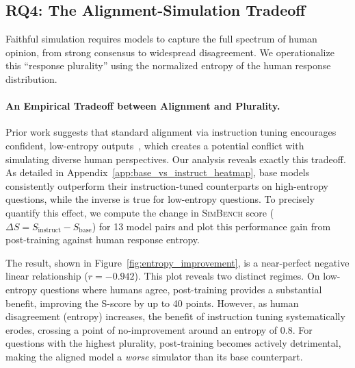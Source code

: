 \documentclass{article} %
\begin{document}
\subsection{RQ4: The Alignment-Simulation Tradeoff}
\label{sec:response_plurality}

Faithful simulation requires models to capture the full spectrum of human opinion, from strong consensus to widespread disagreement. We operationalize this ``response plurality'' using the normalized entropy of the human response distribution. 

\paragraph{An Empirical Tradeoff between Alignment and Plurality.}
Prior work suggests that standard alignment via instruction tuning encourages confident, low-entropy outputs~\citep{brown2020language, tian-etal-2023-just, NEURIPS2024_cruz, meister-etal-2025-benchmarking}, which creates a potential conflict with simulating diverse human perspectives. 
Our analysis reveals exactly this tradeoff. As detailed in Appendix~\ref{app:base_vs_instruct_heatmap}, base models consistently outperform their instruction-tuned counterparts on high-entropy questions, while the inverse is true for low-entropy questions. To precisely quantify this effect, we compute the change in \textsc{SimBench} score ($\Delta S = S_{\text{instruct}} - S_{\text{base}}$) for 13 model pairs and plot this performance gain from post-training against human response entropy.

The result, shown in Figure~\ref{fig:entropy_improvement}, is a near-perfect negative linear relationship ($r = -0.942$). This plot reveals two distinct regimes. On low-entropy questions where humans agree, post-training provides a substantial benefit, improving the S-score by up to 40 points. However, as human disagreement (entropy) increases, the benefit of instruction tuning systematically erodes, crossing a point of no-improvement around an entropy of 0.8. For questions with the highest plurality, post-training becomes actively detrimental, making the aligned model a \textit{worse} simulator than its base counterpart.
\end{document}
